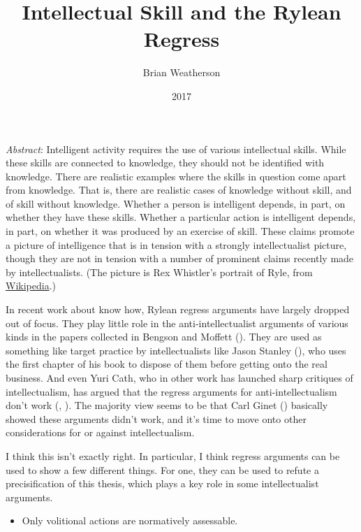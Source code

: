 \documentclass[
  11pt,
  letterpaper,
  DIV=11,
  numbers=noendperiod,
  twoside]{scrartcl}
\title{Intellectual Skill and the Rylean Regress}
\author{Brian Weatherson}
\date{2017}
\providecommand{\tightlist}{%
  \setlength{\itemsep}{0pt}\setlength{\parskip}{0pt}}
\renewenvironment{abstract}
 {\vspace{-1.25cm}
 \quotation\small\noindent\emph{Abstract}:}
 {\endquotation}
\renewenvironment{abstract}
 {\quotation\small\noindent\emph{Abstract}:}
 {\endquotation\vspace{-0.02cm}}
\begin{document}
\maketitle
\begin{abstract}
Intelligent activity requires the use of various intellectual skills.
While these skills are connected to knowledge, they should not be
identified with knowledge. There are realistic examples where the skills
in question come apart from knowledge. That is, there are realistic
cases of knowledge without skill, and of skill without knowledge.
Whether a person is intelligent depends, in part, on whether they have
these skills. Whether a particular action is intelligent depends, in
part, on whether it was produced by an exercise of skill. These claims
promote a picture of intelligence that is in tension with a strongly
intellectualist picture, though they are not in tension with a number of
prominent claims recently made by intellectualists. (The picture is Rex
Whistler's portrait of Ryle, from
\href{https://en.wikipedia.org/wiki/Gilbert_Ryle\#/media/File:Rex_Whistler_-_Gilbert_Ryle,_Fellow.jpg}{Wikipedia}.)
\end{abstract}


In recent work about know how, Rylean regress arguments have largely
dropped out of focus. They play little role in the anti-intellectualist
arguments of various kinds in the papers collected in Bengson and
Moffett (). They are used as
something like target practice by intellectualists like Jason Stanley
(), who uses the first chapter of his
book to dispose of them before getting onto the real business. And even
Yuri Cath, who in other work has launched sharp critiques of
intellectualism, has argued that the regress arguments for
anti-intellectualism don't work (,
). The majority view seems to be that Carl
Ginet () basically showed these arguments
didn't work, and it's time to move onto other considerations for or
against intellectualism.

I think this isn't exactly right. In particular, I think regress
arguments can be used to show a few different things. For one, they can
be used to refute a precisification of this thesis, which plays a key
role in some intellectualist arguments.

\begin{itemize}
\tightlist
\item
  Only volitional actions are normatively assessable.
\end{itemize}
\end{document}
